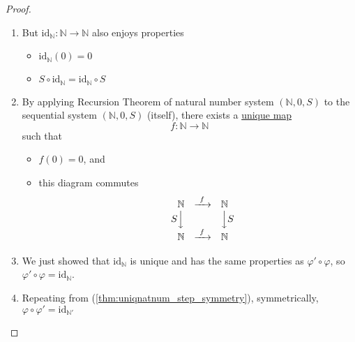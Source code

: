 \documentclass[12pt]{article}
\newenvironment{prf}
{
    \begin{proof}
        \hfill
        \begin{enumerate}[label*=\arabic*.]
                }
                {
                \hfill\qedsymbol
        \end{enumerate}
    \renewcommand{\qedsymbol}{}
    \end{proof}
}
\theoremstyle{definition}
\newcommand{\nat}{\mathbb{N}}
\let\phi\varphi
\begin{document}
\begin{prf}
\begin{itemize}
$$\begin{matrix*}[l]
                &S\Big\downarrow & &\Big\downarrow S' &&\Big\downarrow S  \\
                &\phantom{S}\nat &\xrightarrow{\ \phi\ } &\nat' &\xrightarrow{\ \phi'\ } &\nat
            \end{matrix*} $$
            ie. $S\circ(\phi'\circ\phi) = (\phi'\circ\phi)\circ S$
    \end{itemize}
\item But $\text{id}_\nat: \nat\to\nat$ also enjoys properties
    \begin{itemize}
        \item $\text{id}_\nat(0) = 0$
        \item $S\circ\text{id}_\nat = \text{id}_\nat\circ S$
    \end{itemize}
\item By applying Recursion Theorem of natural number system $(\nat,0,S)$ to the sequential system $(\nat,0,S)$ (itself), there exists a \underline{unique map}
    $$f:\nat\to\nat$$ such that
    \begin{itemize}
        \item $f(0) = 0$, and
        \item this diagram commutes
            $$ \begin{matrix*}[l]
                &\phantom{S}\nat &\xrightarrow{\ f\ } &\nat  \\
                &S\Big\downarrow &&\Big\downarrow S  \\
                &\phantom{S}\nat &\xrightarrow{\ f\ } &\nat
            \end{matrix*} $$
    \end{itemize}
\item We just showed that $\text{id}_\nat$ is unique and has the same properties as $\phi'\circ\phi$, so $\phi'\circ\phi = \text{id}_\nat$.
\item Repeating from (\ref{thm:uniqnatnum_step_symmetry}), symmetrically, $\phi\circ\phi' = \text{id}_{\nat'}$
\end{prf}
\end{document}
